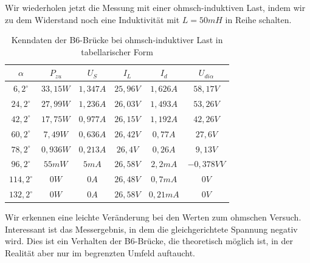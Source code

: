 \documentclass{article}
\begin{document}
Wir wiederholen jetzt die Messung mit einer ohmsch-induktiven Last, indem wir zu dem Widerstand noch eine Induktivität mit $L = 50mH$ in Reihe schalten.

\begin{table}[h]
  \centering
  \begin{tabular}{|c|c|c|c|c|c|}
    \hline
    $\alpha$ & $P_{zu}$ & $U_{S}$ & $I_{L}$ & $I_{d}$ & $U_{di\alpha}$\\
    \hline
    $6,2^{\circ}$ & $33,15W$ & $1,347A$ & $25,96V$ & $1,626A$ & $58,17V$ \\
    \hline
    $24,2^{\circ}$ & $27,99W$ & $1,236A$ & $26,03V$ & $1,493A$ & $53,26V$\\
    \hline
    $42,2^{\circ}$ & $17,75W$ & $0,977A$ & $26,15V$ & $1,192A$ & $42,26V$ \\
    \hline
    $60,2^{\circ}$ & $7,49W$ & $0,636A$ & $26,42V$ & $0,77A$ & $27,6V$ \\
    \hline
    $78,2^{\circ}$ & $0,936W$ & $0,213A$ & $26,4V$ & $0,26A$ & $9,13V$\\
    \hline
    $96,2^{\circ}$ & $55mW$ & $5mA$ & $26,58V$ & $2,2mA$ & $-0,378VV$\\
    \hline
    $114,2^{\circ}$ & $0W$ & $0A$ & $26,48V$ & $0,7mA$ & $0V$ \\
    \hline
    $132,2^{\circ}$ & $0W$ & $0A$ & $26,58V$ & $0,21mA$ & $0V$ \\
    \hline
  \end{tabular}
  \caption{Kenndaten der B6-Brücke bei ohmsch-induktiver Last in tabellarischer Form}
  \label{tab:mess2}
\end{table}

Wir erkennen eine leichte Veränderung bei den Werten zum ohmschen Versuch. Interessant ist das Messergebnis, in dem die gleichgerichtete Spannung negativ wird. Dies ist ein Verhalten der B6-Brücke, die theoretisch möglich ist, in der Realität aber nur im begrenzten Umfeld auftaucht.
\end{document}
